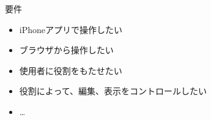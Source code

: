 \documentclass{article}
\begin{document}
  要件
  \begin{itemize}
    \item {iPhoneアプリで操作したい}
    \item {ブラウザから操作したい}
    \item {使用者に役割をもたせたい}
    \item {役割によって、編集、表示をコントロールしたい}
    \item \ldots
  \end{itemize}  
 
\end{document}
